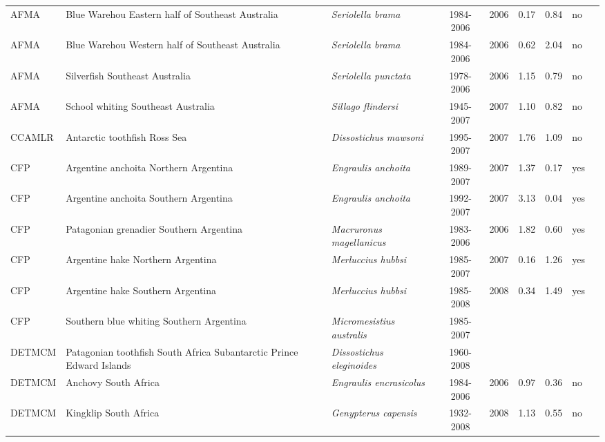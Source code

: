 \begin{longtable}{p{1.8cm}p{4cm}p{4cm}ccccp{1.9cm}c}
  AFMA & Blue Warehou Eastern half of Southeast Australia & \textit{Seriolella brama} & 1984-2006 & 2006 & 0.17 & 0.84 & no & \cite{WAREHOUSE.pdf} \\ 
  AFMA & Blue Warehou Western half of Southeast Australia & \textit{Seriolella brama} & 1984-2006 & 2006 & 0.62 & 2.04 & no & \cite{WAREHOUSE.pdf} \\ 
  AFMA & Silverfish Southeast Australia & \textit{Seriolella punctata} & 1978-2006 & 2006 & 1.15 & 0.79 & no & \cite{SILVERFISHSE.pdf} \\ 
  AFMA & School whiting Southeast Australia & \textit{Sillago flindersi} & 1945-2007 & 2007 & 1.10 & 0.82 & no & \cite{SWHITSE.pdf} \\ 
  CCAMLR & Antarctic toothfish Ross Sea & \textit{Dissostichus mawsoni} & 1995-2007 & 2007 & 1.76 & 1.09 & no & \cite{ATOOTHFISHRS.pdf} \\ 
  CFP & Argentine anchoita Northern Argentina & \textit{Engraulis anchoita} & 1989-2007 & 2007 & 1.37 & 0.17 & yes & \cite{Hansen-ANCHOVY-N-2007.pdf} \\ 
  CFP & Argentine anchoita Southern Argentina & \textit{Engraulis anchoita} & 1992-2007 & 2007 & 3.13 & 0.04 & yes & \cite{Hansen-ANCHOVY-S-2007.pdf} \\ 
  CFP & Patagonian grenadier Southern Argentina & \textit{Macruronus magellanicus} & 1983-2006 & 2006 & 1.82 & 0.60 & yes & \cite{Giussi-hoki-2007.pdf} \\ 
  CFP & Argentine hake Northern Argentina & \textit{Merluccius hubbsi} & 1985-2007 & 2007 & 0.16 & 1.26 & yes & \cite{Irusta-hake-N-2007.pdf} \\ 
  CFP & Argentine hake Southern Argentina & \textit{Merluccius hubbsi} & 1985-2008 & 2008 & 0.34 & 1.49 & yes & \cite{Renzi-hake-S-2009.pdf} \\ 
  CFP &  Southern blue whiting Southern Argentina & \textit{Micromesistius australis} & 1985-2007 &  &  &  &  & \cite{Giussi-polaca-2007.pdf} \\ 
  DETMCM & Patagonian toothfish South Africa Subantarctic Prince Edward Islands & \textit{Dissostichus eleginoides} & 1960-2008 &  &  &  &  & \cite{Branch-SA-Toothfish-2007.pdf} \\ 
  DETMCM & Anchovy South Africa & \textit{Engraulis encrasicolus} & 1984-2006 & 2006 & 0.97 & 0.36 & no & \cite{ANCHOSA.pdf} \\ 
  DETMCM & Kingklip South Africa & \textit{Genypterus capensis} & 1932-2008 & 2008 & 1.13 & 0.55 & no & \cite{Branch-SA-Kingklip-2008.pdf} \\ 

\end{longtable}
